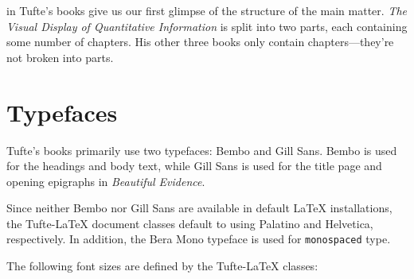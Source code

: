 \documentclass[a4paper,nofonts,notoc,oneside,openany,nobib]{tufte-book}
\newcommand{\VDQI}{\textit{The Visual Display of Quantitative Information}\xspace}
\newcommand{\BE}{\textit{Beautiful Evidence}\xspace}
\newcommand{\TL}{Tufte-\LaTeX\xspace}
\begin{document}
 in Tufte's books give us our first
glimpse of the structure of the main matter.  \VDQI is split into two
parts, each containing some number of chapters.  His other three books only
contain chapters---they're not broken into parts.




\section{Typefaces}\label{sec:typefaces1}

Tufte's books primarily use two typefaces: Bembo and Gill Sans.  Bembo is used
for the headings and body text, while Gill Sans is used for the title page and
opening epigraphs in \BE.

Since neither Bembo nor Gill Sans are available in default \LaTeX{}
installations, the \TL document classes default to using Palatino and
Helvetica, respectively.  In addition, the Bera Mono typeface is used for
\texttt{monospaced} type.

The following font sizes are defined by the \TL classes:
\end{document}
